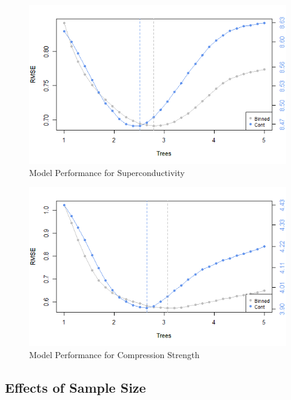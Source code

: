 \documentclass[10pt]{article}\usepackage[]{graphicx}\usepackage[]{xcolor}
\begin{document}
\begin{figure}[htp]
  \centering
  \includegraphics[scale=0.8]{effects_of_complexity/final_conduct_complexity_with_max.png}
  \caption{Model Performance for Superconductivity}
  \label{img:conduct_optimal_trees}
\end{figure}



\begin{figure}[htp]
  \centering
  \includegraphics[scale=0.8]{effects_of_complexity/final_concrete_complexity_with_max.png}
  \caption{Model Performance for Compression Strength}
  \label{img:concrete_optimal_trees}
\end{figure}




\newpage








\subsection{Effects of Sample Size}
\end{document}
